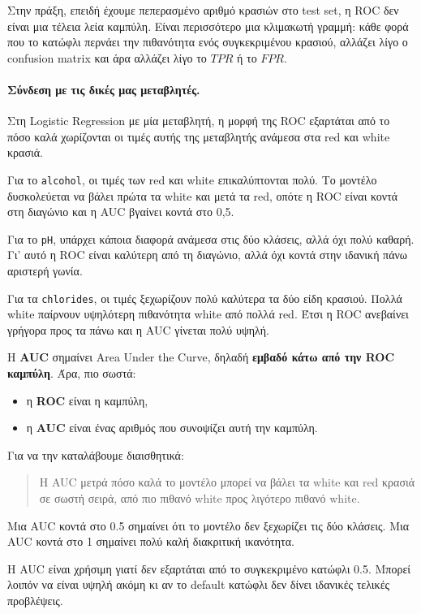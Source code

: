 \documentclass[11pt,a4paper]{article}
\newcommand{\code}[1]{\texttt{#1}}
\newcommand{\eng}[1]{\textenglish{#1}}
\begin{document}
Στην πράξη, επειδή έχουμε πεπερασμένο αριθμό κρασιών στο test set, η ROC δεν
είναι μια τέλεια λεία καμπύλη. Είναι περισσότερο μια κλιμακωτή γραμμή:
κάθε φορά που το κατώφλι περνάει την πιθανότητα ενός συγκεκριμένου κρασιού,
αλλάζει λίγο ο confusion matrix και άρα αλλάζει λίγο το \(TPR\) ή το \(FPR\).

\paragraph{Σύνδεση με τις δικές μας μεταβλητές.}
Στη Logistic Regression με μία μεταβλητή, η μορφή της ROC εξαρτάται από το
πόσο καλά χωρίζονται οι τιμές αυτής της μεταβλητής ανάμεσα στα red και white
κρασιά.

Για το \code{alcohol}, οι τιμές των red και white επικαλύπτονται πολύ. Το
μοντέλο δυσκολεύεται να βάλει πρώτα τα white και μετά τα red, οπότε η ROC
είναι κοντά στη διαγώνιο και η AUC βγαίνει κοντά στο 0,5.

Για το \code{pH}, υπάρχει κάποια διαφορά ανάμεσα στις δύο κλάσεις, αλλά όχι
πολύ καθαρή. Γι' αυτό η ROC είναι καλύτερη από τη διαγώνιο, αλλά όχι κοντά
στην ιδανική πάνω αριστερή γωνία.

Για τα \code{chlorides}, οι τιμές ξεχωρίζουν πολύ καλύτερα τα δύο είδη
κρασιού. Πολλά white παίρνουν υψηλότερη πιθανότητα white από πολλά red. Έτσι
η ROC ανεβαίνει γρήγορα προς τα πάνω και η AUC γίνεται πολύ υψηλή.

Η \textbf{AUC} σημαίνει \eng{Area Under the Curve}, δηλαδή
\textbf{εμβαδό κάτω από την ROC καμπύλη}. Άρα, πιο σωστά:
\begin{itemize}
    \item η \textbf{ROC} είναι η καμπύλη,
    \item η \textbf{AUC} είναι ένας αριθμός που συνοψίζει αυτή την καμπύλη.
\end{itemize}

Για να την καταλάβουμε διαισθητικά:
\begin{quote}
Η AUC μετρά πόσο καλά το μοντέλο μπορεί να βάλει τα white και red κρασιά
σε σωστή σειρά, από πιο πιθανό white προς λιγότερο πιθανό white.
\end{quote}

Μια AUC κοντά στο 0.5 σημαίνει ότι το μοντέλο δεν ξεχωρίζει τις δύο κλάσεις.
Μια AUC κοντά στο 1 σημαίνει πολύ καλή διακριτική ικανότητα.

Η AUC είναι χρήσιμη γιατί δεν εξαρτάται από το συγκεκριμένο κατώφλι 0.5.
Μπορεί λοιπόν να είναι υψηλή ακόμη κι αν το default κατώφλι δεν δίνει
ιδανικές τελικές προβλέψεις.
\end{document}
